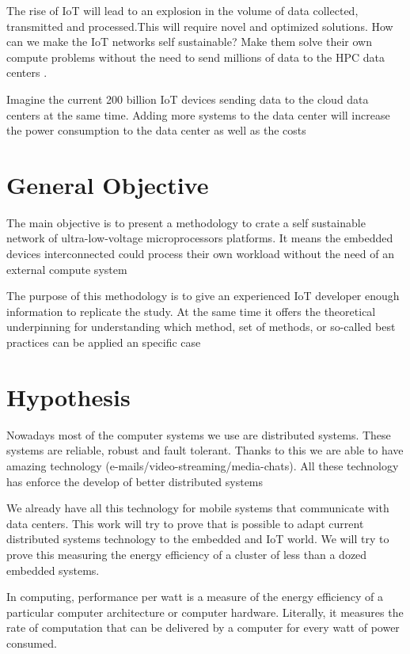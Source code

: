 The rise of IoT will lead to an explosion in the volume of data collected, 
transmitted and processed.This will require novel and optimized solutions. 
How can we make the IoT networks self sustainable? Make them solve their own compute problems 
without the need to send millions of data to the HPC data centers . 

Imagine the current 200 billion IoT devices sending data to the cloud data 
centers at the same time. Adding more systems to the data center will increase 
the power consumption to the data center as well as the costs

\section{General Objective}
\noindent

The main objective is to present a methodology to crate a self sustainable
network of ultra-low-voltage microprocessors platforms. It means the embedded 
devices interconnected could process their own workload without the need of an 
external compute system

The purpose of this methodology is to give an experienced IoT  developer 
enough information to replicate the study. At the same time it offers the theoretical 
underpinning for understanding which method, set of methods, or so-called best 
practices can be applied an specific case


\section{Hypothesis}
\noindent

Nowadays most of the computer systems we use are distributed systems. These
systems are reliable, robust and fault tolerant. Thanks to this we are able to
have amazing technology (e-mails/video-streaming/media-chats). All these
technology has enforce the develop of better distributed systems

We already have all this technology for mobile systems that communicate with
data centers. This work will try to prove that is possible to adapt current
distributed systems technology to the embedded and IoT world. We will try to
prove this measuring the energy efficiency of a cluster of less than a dozed 
embedded systems. 

In computing, performance per watt is a measure of the energy efficiency of a
particular computer architecture or computer hardware. Literally, it measures
the rate of computation that can be delivered by a computer for every watt of
power consumed. 



